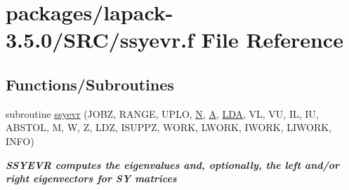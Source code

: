 \hypertarget{ssyevr_8f}{}\section{packages/lapack-\/3.5.0/\+S\+R\+C/ssyevr.f File Reference}
\label{ssyevr_8f}
\subsection*{Functions/\+Subroutines}
\begin{DoxyCompactItemize}
\item 
subroutine \hyperlink{group__realSYeigen_ga24155d2da67fb4a896c5f8257589b19f}{ssyevr} (J\+O\+B\+Z, R\+A\+N\+G\+E, U\+P\+L\+O, \hyperlink{polmisc_8c_a0240ac851181b84ac374872dc5434ee4}{N}, \hyperlink{classA}{A}, \hyperlink{example__user_8c_ae946da542ce0db94dced19b2ecefd1aa}{L\+D\+A}, V\+L, V\+U, I\+L, I\+U, A\+B\+S\+T\+O\+L, M, W, Z, L\+D\+Z, I\+S\+U\+P\+P\+Z, W\+O\+R\+K, L\+W\+O\+R\+K, I\+W\+O\+R\+K, L\+I\+W\+O\+R\+K, I\+N\+F\+O)
\begin{DoxyCompactList}\small\item\em {\bfseries  S\+S\+Y\+E\+V\+R computes the eigenvalues and, optionally, the left and/or right eigenvectors for S\+Y matrices} \end{DoxyCompactList}\end{DoxyCompactItemize}

